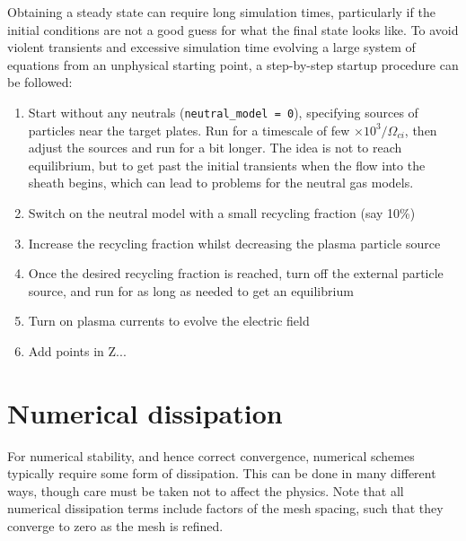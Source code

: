 \documentclass[12pt,a4paper]{article}
\begin{document}
Obtaining a steady state can require long simulation times, particularly if the initial conditions are not a good
guess for what the final state looks like. To avoid violent transients and excessive simulation time evolving
a large system of equations from an unphysical starting point, a step-by-step startup procedure can be followed:
\begin{enumerate}
\item Start without any neutrals (\texttt{neutral\_model = 0}), specifying sources of particles near the target plates.
  Run for a timescale of few $\times 10^3 / \Omega_{ci}$, then adjust the sources and run for a bit longer. The idea
  is not to reach equilibrium, but to get past the initial transients when the flow into the sheath begins, which can
  lead to problems for the neutral gas models.
\item Switch on the neutral model with a small recycling fraction (say 10\%)
\item Increase the recycling fraction whilst decreasing the plasma particle source
\item Once the desired recycling fraction is reached, turn off the external particle source,
  and run for as long as needed to get an equilibrium
\item Turn on plasma currents to evolve the electric field
\item Add points in Z...
\end{enumerate}


\section{Numerical dissipation}
\label{sec:dissipation}

For numerical stability, and hence correct convergence, numerical schemes
typically require some form of dissipation. This can be done in many different ways,
though care must be taken not to affect the physics. Note that
all numerical dissipation terms include factors of the mesh spacing,
such that they converge to zero as the mesh is refined.
\end{document}

